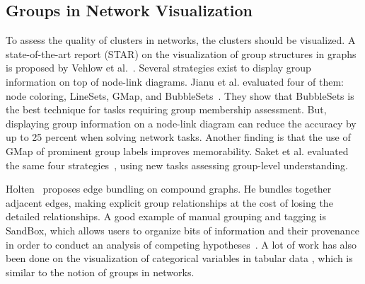 \subsection{Groups in Network Visualization}

To assess the quality of clusters in networks, the clusters should be visualized.
A state-of-the-art report (STAR) on the visualization of group structures in graphs is proposed by Vehlow et al.~\cite{EVstar.groupstructures15}.
Several strategies exist to display group information on top of node-link diagrams. Jianu et al. evaluated four of them: node coloring, LineSets, GMap, and BubbleSets~\cite{jianuHowDisplayGroup2014}. They show that BubbleSets is the best technique for tasks requiring group membership assessment.
But, displaying group information on a node-link diagram can reduce the accuracy by up to 25 percent when solving network tasks.
Another finding is that the use of GMap of prominent group labels improves memorability. Saket et al. evaluated the same four strategies~\cite{Saket14}, using new tasks assessing group-level understanding.

Holten~\cite{holtenHierarchicalEdgeBundles2006} proposes edge bundling on compound graphs. He bundles together adjacent edges, making explicit group relationships at the cost of losing the detailed relationships.
A good example of manual grouping and tagging is SandBox, which allows users to organize bits of information and their provenance in order to conduct an analysis of competing hypotheses~\cite{wrightSandboxAnalysisConcepts2006}. A lot of work has also been done on the visualization of categorical variables in tabular data \cite{kosaraParallelSetsInteractive2006, gratzlDominoExtractingComparing2014}, which is similar to the notion of groups in networks.


